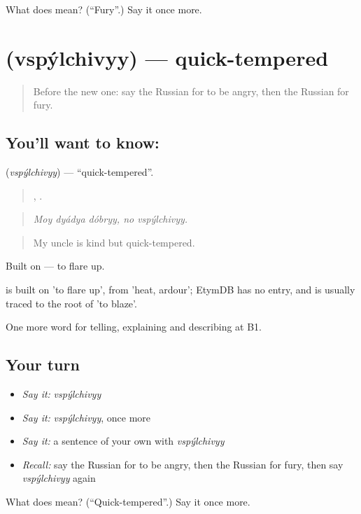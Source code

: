 \begin{tcolorbox}[breakable,colback=teal!4,colframe=teal!35!black,title={Before you move on}]
What does  mean? (\textquotedblleft{}Fury\textquotedblright{}.) Say it once more.
\end{tcolorbox}
\section[\texorpdfstring{\ru{вспыльчивый} (vspýlchivyy)}{вспыльчивый (vspýlchivyy)}]{ (vspýlchivyy) — quick-tempered}

\label{lesson:RU-C472-vspylchivyy}



\begin{quote}
Before the new one: say the Russian for to be angry, then the Russian for fury.
\end{quote}

\subsection*{You'll want to know: }
\textbf{} (\emph{vspýlchivyy}) — \textquotedblleft{}quick-tempered\textquotedblright{}.

\begin{quote}
  ,  .
\end{quote}

\begin{quote}
\emph{Moy dyádya dóbryy, no vspýlchivyy.}
\end{quote}

\begin{quote}
My uncle is kind but quick-tempered.
\end{quote}

Built on \emph{} — to flare up.

\begin{cousinweb}
\emph{} is built on \emph{} 'to flare up', from \emph{} 'heat, ardour'; EtymDB has no entry, and \emph{} is usually traced to the root of \emph{} 'to blaze'.
\end{cousinweb}

\begin{grammarlens}[title={What you've built}]
One more word for telling, explaining and describing at B1.
\end{grammarlens}

\subsection*{Your turn}
\begin{itemize}
\raggedright
  \item \emph{Say it:} \emph{vspýlchivyy}
  \item \emph{Say it:} \emph{vspýlchivyy}, once more
  \item \emph{Say it:} a sentence of your own with \emph{vspýlchivyy}
  \item \emph{Recall:} say the Russian for to be angry, then the Russian for fury, then say \emph{vspýlchivyy} again
\end{itemize}

\begin{tcolorbox}[breakable,colback=teal!4,colframe=teal!35!black,title={Before you move on}]
What does  mean? (\textquotedblleft{}Quick-tempered\textquotedblright{}.) Say it once more.
\end{tcolorbox}
